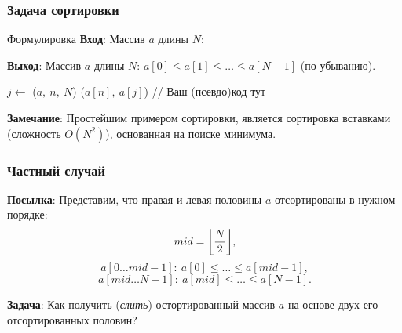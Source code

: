 \documentclass{beamer}
\DeclarePairedDelimiter\floor{\lfloor}{\rfloor}
\begin{document}
    \begin{frame}[fragile]
        \frametitle{Задача сортировки}
        \begin{block}{Формулировка}
            \justifying
            {\bf Вход}: Массив $a$ длины $N$;
            \par
            {\bf Выход}: Массив $a$ длины $N$: $a[0] \leq a[1] \leq \dotsc \leq a[N - 1]$ (по убыванию).
        \end{block}
        \par
        \begin{algorithm}[H]
            \DontPrintSemicolon

            {
                {
                    $j \leftarrow$ \FMinIndex($a,\ n,\ N$)\;
                    \FSwap($a[n],\ a[j]$)\;
                }
            }
            \;
            {
                // Ваш (псевдо)код тут
            }
            \;
        \end{algorithm}
        \justifying
        \par
        {\bf Замечание}: Простейшим примером сортировки, является сортировка вставками (сложность $O(N^{2})$), основанная на поиске минимума.
    \end{frame}
    \begin{frame}
        \frametitle{Частный случай}
        \justifying
        {\bf Посылка}: Представим, что правая и левая половины $a$ отсортированы в нужном порядке:
        $$mid = \floor*{\frac{N}{2}},$$
        $$a[0\dotsc  mid - 1]:\ a[0] \leq \dotsc \leq a[mid - 1],$$
        $$a[mid \dotsc N - 1]:\ a[mid] \leq \dotsc \leq a[N - 1].$$
        \par
        \vspace{0.2cm}
        \justifying
        {\bf Задача}: Как получить ({\it слить}) остортированный массив $a$ на основе двух его отсортированных половин?
    \end{frame}
\end{document}
